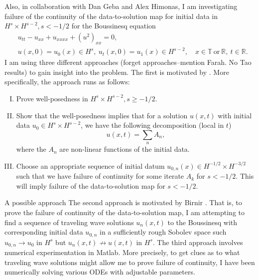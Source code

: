 \documentclass[12pt,reqno]{amsart}
\newcommand{\rr}{\mathbb{R}}
\newcommand{\ci}{\mathbb{T}}
\begin{document}
Also, in collaboration with Dan Geba and Alex Himonas,
I am investigating failure of the continuity of the data-to-solution map for
initial data in $H^{s} \times H^{s-2}, s < -1/2$ for the Boussinesq equation
\begin{align}
   & u_{tt} - u_{xx} + u_{xxxx} + (u^{2})_{xx} = 0,
  \\
   & u(x,0) = u_{0}(x) \in H^{s}, \  u_{t}(x,0) = u_{1}(x) \in H^{s-2},
  \quad x \in \ci \ \text{or} \ \rr, \ t \in \rr. 
\end{align} 
I am using three
different approaches (forget approaches--mention Farah. No Tao results) to gain insight into the problem. The first is motivated by
\cite{Bejenaru-Tao-2006-Sharp-well-posedness-and-ill-posedness}. More
specifically, the approach runs as follows:
\begin{enumerate}[I.]
  \item
    Prove well-posedness in $H^{s} \times H^{s-2}, s \ge -1/2$.
 \item
   Show that the well-posedness implies that for a solution $u(x,t)$ with
   initial data $u_{0} \in H^{s} \times H^{s-2}$, we have the following
   decomposition (local in $t$) 
   $$u(x,t) = \sum_{n} A_{n},$$ where the $A_{n}$ are non-linear functions of
   the initial data. 
 \item 
   Choose an appropriate sequence of initial datum $u_{0,n}(x) \in H^{-1/2}
   \times H^{-3/2}$ such that
   we have failure of continuity for some iterate $A_{k}$ for $s < -1/2$.
   This will imply
   failure of the data-to-solution map for $s < -1/2$.
   \end{enumerate}
%
A possible approach
The second approach is motivated by Birnir \cite{Birnir:1996uq}. That is,
to prove the failure of continuity of the data-to-solution map, I am attempting
to find a sequence of traveling wave solutions $u_{n}(x,t)$ to the Boussinesq with
corresponding initial data $u_{0,n}$ in a sufficiently rough Sobolev space such 
$u_{0,n} \to u_{0}$ in $H^{s}$ but $u_{n}(x,t) \not \to u(x,t)$ in $H^{s}$. 
The third approach involves numerical experimentation in Matlab. More
precisely, to get clues as to what traveling wave solutions might allow me
to prove failure of continuity, I have been numerically solving various ODEs
with adjustable parameters. 
\end{document}
